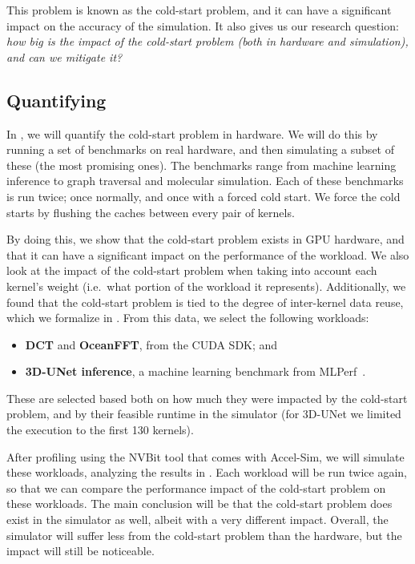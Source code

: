 This problem is known as the cold-start problem, and it can have a significant impact on the accuracy of the simulation.
It also gives us our research question: \textit{how big is the impact of the cold-start problem (both in hardware and simulation), and can we mitigate it?}

\subsection{Quantifying}\label{subsec:quantifying}
In , we will quantify the cold-start problem in hardware.
We will do this by running a set of benchmarks on real hardware, and then simulating a subset of these (the most promising ones).
The benchmarks range from machine learning inference to graph traversal and molecular simulation.
Each of these benchmarks is run twice; once normally, and once with a forced cold start.
We force the cold starts by flushing the caches between every pair of kernels.

By doing this, we show that the cold-start problem exists in GPU hardware, and that it can have a significant impact on the performance of the workload.
We also look at the impact of the cold-start problem when taking into account each kernel's weight (i.e.\ what portion of the workload it represents).
Additionally, we found that the cold-start problem is tied to the degree of inter-kernel data reuse, which we formalize in .
From this data, we select the following workloads:
\begin{itemize}
    \item \textbf{DCT} and \textbf{OceanFFT}, from the CUDA SDK; and
    \item \textbf{3D-UNet inference}, a machine learning benchmark from MLPerf~\cite{mlperf}.
\end{itemize}
These are selected based both on how much they were impacted by the cold-start problem, and by their feasible runtime in the simulator (for 3D-UNet we limited the execution to the first 130 kernels).

After profiling using the NVBit tool that comes with Accel-Sim, we will simulate these workloads, analyzing the results in .
Each workload will be run twice again, so that we can compare the performance impact of the cold-start problem on these workloads.
The main conclusion will be that the cold-start problem does exist in the simulator as well, albeit with a very different impact.
Overall, the simulator will suffer less from the cold-start problem than the hardware, but the impact will still be noticeable.

